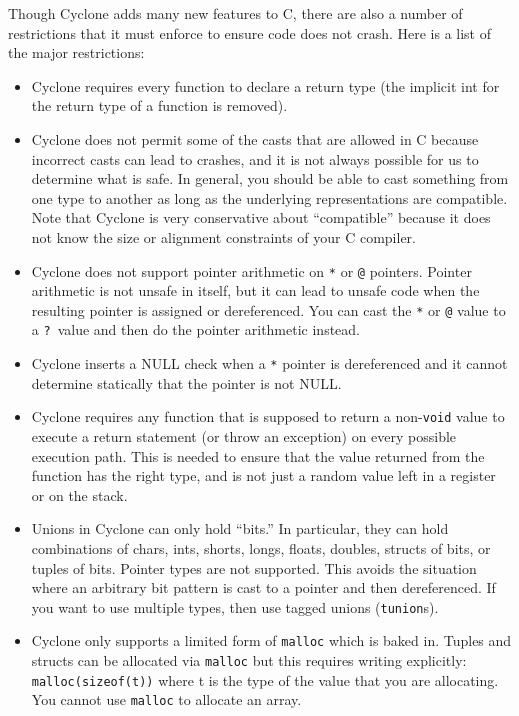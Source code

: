 Though Cyclone adds many new features to C, there are also a number
of restrictions that it must enforce to ensure code does not crash.
Here is a list of the major restrictions:
\begin{itemize}
\item Cyclone requires every function to declare a return type (the
  implicit int for the return type of a function is removed).

\item Cyclone does not permit some of the casts that are allowed in C because
  incorrect casts can lead to crashes, and it is not always possible
  for us to determine what is safe.  In general, you should be
  able to cast something from one type to another as long as the
  underlying representations are compatible.  Note that Cyclone is
  very conservative about ``compatible'' because it does not know
  the size or alignment constraints of your C compiler.  

\item Cyclone does not support pointer arithmetic on \texttt{*} or
  \texttt{@} pointers.  Pointer arithmetic is not unsafe in itself, but
  it can lead to unsafe code when the resulting pointer is assigned or
  dereferenced.  You can cast the \texttt{*} or \texttt{@} value to a
  \texttt{?}\ value and then do the pointer arithmetic instead.

\item Cyclone inserts a NULL check when a \texttt{*} pointer is
  dereferenced and it cannot determine statically that the pointer is
  not NULL\@.

\item Cyclone requires any function that is supposed to return a
  non-\texttt{void} value to execute a return statement (or throw an
  exception) on every possible execution path. This is needed to
  ensure that the value returned from the function has the right type,
  and is not just a random value left in a register or on the stack.

\item Unions in Cyclone can only hold ``bits.''  In particular, they
  can hold combinations of chars, ints, shorts, longs, floats,
  doubles, structs of bits, or tuples of bits. Pointer types are not
  supported.  This avoids the situation where an arbitrary bit pattern
  is cast to a pointer and then dereferenced. If you want to use
  multiple types, then use tagged unions (\texttt{tunion}s).

\item Cyclone only supports a limited form of \texttt{malloc} which is
  baked in. Tuples and structs can be allocated via \texttt{malloc}
  but this requires writing explicitly: \texttt{malloc(sizeof(t))}
  where t is the type of the value that you are allocating.  You
  cannot use \texttt{malloc} to allocate an array.


\end{itemize}
